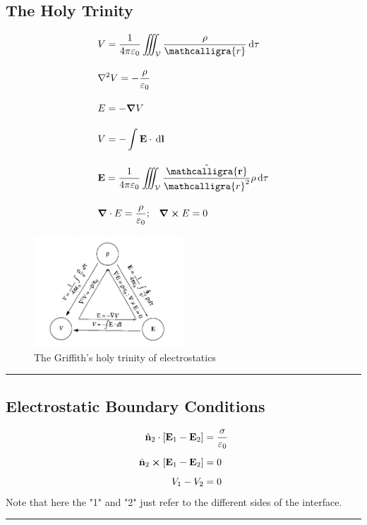 \documentclass[a4paper]{article}
\newcommand{\dmr}[1]{\, \mathrm{d}#1} %
\numberwithin{equation}{subsection}
\newcommand{\curly}[1]{\ensuremath{\mathcalligra{#1}}}
\let\oldhat\hat
\renewcommand{\vec}[1]{\mathbf{#1}}
\renewcommand{\hat}[1]{\oldhat{\mathbf{#1}}}
\begin{document}
\subsection{The Holy Trinity}
\begin{align}
    &V = \frac{1}{4\pi\varepsilon_0}\iiint_{\mathcal{V}} \frac{\rho}{\curly{r}}\dmr{\tau}\\[1em]
    &\laplacian V = -\frac{\rho}{\varepsilon_0}\\[1em]
    &E = - \grad V\\[1em]
    &V = -\int \vec{E}\cdot \dmr{\vec{l}}\\[1em]
    &\vec{E} = \frac{1}{4\pi\varepsilon_0}\iiint_{\mathcal{V}} \frac{\hat{\curly{r}}}{\curly{r}^2}\rho\dmr{\tau}\\[1em]
    &\grad \cdot E = \frac{\rho}{\varepsilon_0}; \;\;\; \grad \cross E = 0
\end{align}
\begin{figure}[h]
    \centering
    \includegraphics[width =0.5\textwidth]{holytrinity.png}
    \caption{The Griffith's holy trinity of electrostatics\cite{Griffiths:611579}}
\end{figure}

\par\noindent\rule{\textwidth}{0.4pt}
\subsection{Electrostatic Boundary Conditions}
\begin{align}
    \hat{n}_2 \cdot [\vec{E}_1-\vec{E}_2] &= \frac{\sigma}{\varepsilon_0}\\[0.5em]
    \hat{n}_2 \cross [\vec{E}_1-\vec{E}_2] &= 0\\[0.5em]
    V_1 - V_2 &= 0
\end{align}
Note that here the "1" and "2" just refer to the different sides of the interface.

\par\noindent\rule{\textwidth}{0.4pt}
\end{document}
